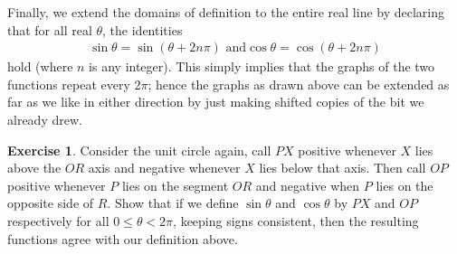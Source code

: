 \documentclass[a4paper,leqno]{article}
\numberwithin{equation}{section}
\theoremstyle{definition}
\newtheorem{exercise}[equation]{Exercise}
\theoremstyle{remark}
\begin{document}
Finally, we extend the domains of definition to the entire real line by declaring that for all real $ \theta $, the identities
\begin{gather}
  \sin \theta = \sin (\theta + 2n\pi)\text{ and}
  \cos \theta = \cos (\theta + 2n\pi)
\end{gather}
hold (where $ n $ is any integer). This simply implies that the graphs of the two functions repeat every $ 2\pi $; hence the graphs
as drawn above can be extended as far as we like in either direction by just making shifted copies of the bit we already drew.
\begin{center}
\end{center}


\begin{exercise}\label{ex:geomdefn}
  Consider the unit circle again, call $ PX $ positive whenever $ X $ lies above the $ OR $ axis and negative whenever $ X $ lies below that
  axis. Then call $ OP $ positive whenever $ P $ lies on the segment $ OR $ and negative when $ P $ lies on the opposite side of $ R $. Show
  that if we define $ \sin \theta $ and $ \cos \theta $ by $ PX $ and $ OP $ respectively for all $ 0 \leq \theta < 2\pi $, keeping signs
  consistent, then the resulting functions agree with our definition above.
\end{exercise}
\end{document}
